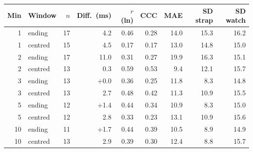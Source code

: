 \begin{tabular}{rlrrrrrrr}
\toprule
Min & Window & $n$ & Diff.\ (ms) & $r$ (ln) & CCC & MAE & SD strap & SD watch \\
\midrule
1 & ending & 17 & \textminus{}4.2 & 0.46 & 0.28 & 14.0 & 15.3 & 16.2 \\
1 & centred & 15 & \textminus{}4.5 & 0.17 & 0.17 & 13.0 & 14.8 & 15.0 \\
2 & ending & 17 & \textminus{}11.0 & \textminus{}0.31 & \textminus{}0.27 & 19.9 & 16.3 & 15.1 \\
2 & centred & 13 & \textminus{}0.3 & 0.59 & 0.53 & 9.4 & 12.1 & 15.7 \\
3 & ending & 13 & +0.0 & 0.36 & 0.25 & 11.8 & 8.3 & 14.8 \\
3 & centred & 13 & \textminus{}2.7 & 0.48 & 0.42 & 11.3 & 10.9 & 15.5 \\
5 & ending & 12 & +1.4 & 0.44 & 0.34 & 10.9 & 8.3 & 15.0 \\
5 & centred & 12 & \textminus{}2.8 & 0.33 & 0.23 & 13.1 & 10.9 & 15.6 \\
10 & ending & 11 & +1.7 & 0.44 & 0.39 & 10.5 & 8.9 & 14.9 \\
10 & centred & 13 & \textminus{}2.9 & 0.39 & 0.30 & 12.4 & 8.8 & 15.7 \\
\bottomrule
\end{tabular}
